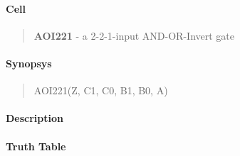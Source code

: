 \label{AOI221}
\paragraph{Cell}
\begin{quote}
    \textbf{AOI221} - a 2-2-1-input AND-OR-Invert gate
\end{quote}

\paragraph{Synopsys}
\begin{quote}
    AOI221(Z, C1, C0, B1, B0, A)
\end{quote}

\paragraph{Description}

%

\paragraph{Truth Table}


